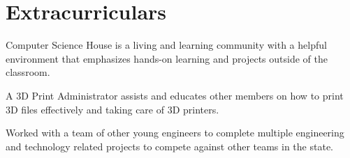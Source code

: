 \documentclass[a4paper]{comcv}
\begin{document}

\section{Extracurriculars}

\vspace{\topsep}
\begin{tightlist}
    \item Computer Science House is a living and learning community with a helpful environment that emphasizes hands-on learning and projects outside of the classroom.
	\item A 3D Print Administrator assists and educates other members on how to print 3D files effectively and taking care of 3D printers.
\end{tightlist}


\vspace{\topsep}
\begin{tightlist}
    \item Worked with a team of other young engineers to complete multiple engineering and technology related projects to compete against other teams in the state.
\end{tightlist}
\end{document}
